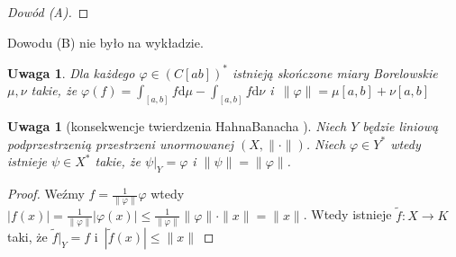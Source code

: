 \documentclass[11pt]{mwrep}
\renewcommand{\[}{\begin{equation}}
\renewcommand{\]}{\end{equation}}
\newcommand{\dd}{\mathrm{d}}
\newcommand{\norm}{\|\cdot\|}
\newtheorem{uwaga}[subsection]{Uwaga}
\begin{document}
\begin{proof}[Dowód (A)]
%
\end{proof}
Dowodu (B) nie było na wykładzie.
\begin{uwaga}
	Dla każdego $\varphi\in (C[ab])^*$ istnieją skończone miary Borelowskie $\mu, \nu$ takie, że 
	$\varphi(f) = \int_{[a,b]} f \dd\mu - \int_{[a,b]} f \dd \nu$ i~$\|\varphi\| = \mu[a,b]+ \nu[a,b]$
\end{uwaga}
\begin{uwaga}[konsekwencje twierdzenia Hahna\dywiz Banacha ]
	Niech $Y$ będzie liniową podprzestrzenią przestrzeni unormowanej $(X,\norm)$.
	Niech $\varphi\in Y^*$ wtedy istnieje $\psi \in X^*$ takie, że $\psi|_Y = \varphi$ i $\|\psi\| = \|\varphi\|$.
	
\end{uwaga}
\begin{proof}
	Weźmy $f= \frac{1}{\|\varphi\|} \varphi$ wtedy 
	$|f(x)| = \frac{1}{\|\varphi\|}|\varphi(x)| \le \frac{1}{\|\varphi\|}\|\varphi\|\cdot \|x\| = \|x\|$.
	Wtedy istnieje $\tilde{f} \colon X \to K$ taki, że $\tilde{f}|_Y = f$ i~$ |\tilde{f}(x) | \le \|x\| $
\end{proof}
\end{document}
